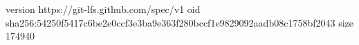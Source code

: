 version https://git-lfs.github.com/spec/v1
oid sha256:54250f5417c6be2e0ccf3e3ba9e363f280bccf1e9829092aadb08c1758bf2043
size 174940
